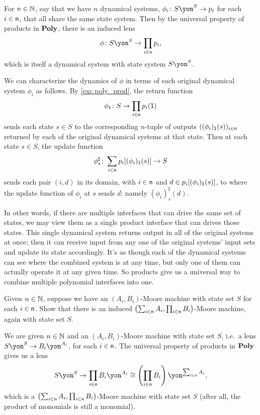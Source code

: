 \documentclass[Book-Poly]{subfiles}
\begin{document}
For $n\in\mathbb{N}$, say that we have $n$ dynamical systems, $\phi_i\colon S\yon^S\to p_i$ for each $i\in\mathsf{n}$, that all share the same state system.
Then by the universal property of products in $\mathbf{Poly}$, there is an induced lens \[\phi\colon S\yon^S\to\prod_{i\in\ord{n}}p_i,\] which is itself a dynamical system with state system $S\yon^S$.

We can characterize the dynamics of $\phi$ in terms of each original dynamical system $\phi_i$ as follows.
By \cref{exc.poly_prod}, the return function \[\phi_{\textsf{1}}\colon S\to\prod_{i\in\mathsf{n}}p_i(\textsf{1})\] sends each state $s\in S$ to the corresponding $n$-tuple of outputs $((\phi_i)_{\textsf{1}}(s))_{i\in\mathsf{n}}$ returned by each of the original dynamical systems at that state.
Then at each state $s\in S$, the update function \[\phi^\sharp_s\colon\sum_{i\in\mathsf{n}}p_i[(\phi_i)_{\textsf{1}}(s)]\to S\] sends each pair $(i,d)$ in its domain, with $i\in\mathsf{n}$ and $d\in p_i[(\phi_i)_{\textsf{1}}(s)]$, to where the update function of $\phi_i$ at $s$ sends $d$: namely $(\phi_i)^\sharp_s(d)$.

In other words, if there are multiple interfaces that can drive the same set of states, we may view them as a single product interface that can drives those states.
This single dynamical system returns output in all of the original systems at once; then it can receive input from any one of the original systems' input sets and update its state accordingly.
It's as though each of the dynamical systems can see where the combined system is at any time, but only one of them can actually operate it at any given time.
So products give us a universal way to combine multiple polynomial interfaces into one.

\begin{exercise}
Given $n\in\mathbb{N}$, suppose we have an $(A_i,B_i)$-Moore machine with state set $S$ for each $i \in \mathsf{n}$.
Show that there is an induced $\left(\sum_{i \in \mathsf{n}} A_i, \prod_{i \in \mathsf{n}} B_i\right)$-Moore machine, again with state set $S$.
\begin{solution}
We are given $n\in\mathbb{N}$ and an $(A_i,B_i)$-Moore machine with state set $S$, i.e.\ a lens $S\yon^S\to B_i\yon^{A_i}$, for each $i\in\mathsf{n}$.
The universal property of products in $\mathbf{Poly}$ gives us a lens
\[
    S\yon^S\to\prod_{i\in\ord{n}}B_i\yon^{A_i}\iso\left(\prod_{i\in\ord{n}}B_i\right)\yon^{\sum_{i\in\ord{n}}A_i},
\]
which is a $\left(\sum_{i \in \mathsf{n}} A_i, \prod_{i \in \mathsf{n}} B_i\right)$-Moore machine with state set $S$ (after all, the product of monomials is still a monomial).
\end{solution}
\end{exercise}
\end{document}
